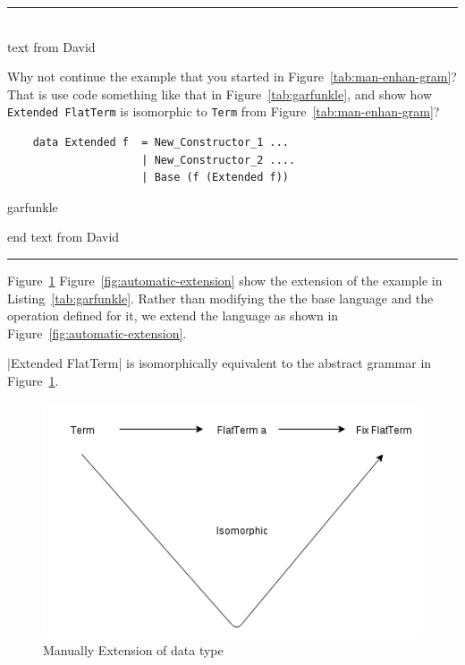 \documentclass[thesis-solanki.tex]{subfiles}
\begin{document}
\begin{center}
  \textcolor{blue}{\rule{0.95\textwidth}{0.2em}}\\[-1ex]
  text from David
\end{center}
Why not continue the example that you started in Figure~\ref{tab:man-enhan-gram}?
That is use code something like that in Figure~\ref{tab:garfunkle}, and show how
\Verb!Extended FlatTerm! is isomorphic to \Verb!Term! from Figure~\ref{tab:man-enhan-gram}?

\begin{code-list}[H]
  \begin{verbatim}
    data Extended f  = New_Constructor_1 ...
                     | New_Constructor_2 ....
                     | Base (f (Extended f))
  \end{verbatim}
  \caption{garfunkle}
  \label{tab:garfunkle}
\end{code-list}
\vspace*{-1.5\baselineskip}
\begin{center}
  end text from David\\[-3ex]
  \textcolor{blue}{\rule{0.95\textwidth}{1pt}}
\end{center}

Figure~\ref{fig:manual-extension} Figure~\ref{fig:automatic-extension} show the extension of the example in Listing~\ref{tab:garfunkle}.
Rather than modifying the the base language and the operation defined for it, we extend the language as shown in 
Figure~\ref{fig:automatic-extension}. 

|Extended FlatTerm| is isomorphically equivalent to the abstract grammar in Figure~\ref{fig:manual-extension}.




\begin{figure}[H]
  \includegraphics[scale=0.3, width=1\textwidth]{extended_data_type_1.png}
  \caption{Manually Extension of data type}
  \label{fig:manual-extension}
\end{figure}
\end{document}
